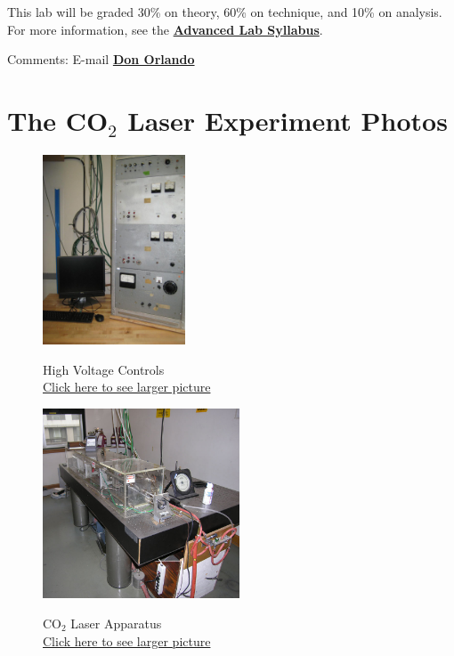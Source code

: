 \documentclass{../lab}
\begin{document}
This lab will be graded 30\% on theory, 60\% on technique, and 10\% on analysis. For more information, see the \href{\AdvancedLabSyllabus}{\textbf{Advanced Lab Syllabus}}.

Comments: E-mail \href{\MailDonOrlando}{\textbf{Don Orlando}}

\section{The CO\texorpdfstring{$_2$}{2} Laser Experiment Photos}

\begin{figure}[H]
\captionsetup{justification=centering}
\centering
  \href{http://experimentationlab.berkeley.edu/sites/default/files/CO-2/CO2__4082B.jpg}{\includegraphics[height=160pt,keepaspectratio]{images/CO2__4082B.jpg}}
  \caption{High Voltage Controls \\ \href{http://experimentationlab.berkeley.edu/sites/default/files/CO-2/CO2__4082B.jpg}{Click here to see larger picture}}
  \label{fig:HighVoltage}
\endminipage\hfill
{}
\centering
  \href{http://experimentationlab.berkeley.edu/sites/default/files/images/CO2_0687B.jpg}{\includegraphics[height=160pt,keepaspectratio]{images/CO2_0687B.jpg}}
  \caption{CO$_2$ Laser Apparatus \\
  \href{http://experimentationlab.berkeley.edu/sites/default/files/images/CO2_0687B.jpg}{Click here to see larger picture}}

\end{figure}
\end{document}
